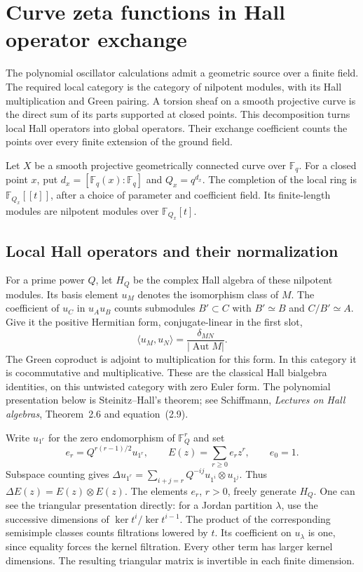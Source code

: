 \section{Curve zeta functions in Hall operator exchange}
\label{intake:curve:section}

The polynomial oscillator calculations admit a geometric source over a
finite field. The required local category is the category of nilpotent
modules, with its Hall multiplication and Green pairing.
A torsion sheaf on a smooth projective curve is the direct sum of its
parts supported at closed points. This decomposition turns local Hall
operators into global operators. Their exchange coefficient counts the
points over every finite extension of the ground field.

Let $X$ be a smooth projective geometrically connected curve over
$\mathbb F_q$. For a closed point $x$, put $d_x=[\mathbb F_q(x):\mathbb F_q]$
and $Q_x=q^{d_x}$. The completion of the local ring is
$\mathbb F_{Q_x}[[t]]$, after a choice of parameter and coefficient field.
Its finite-length modules are nilpotent modules over $\mathbb F_{Q_x}[t]$.

\subsection{Local Hall operators and their normalization}

For a prime power $Q$, let $H_Q$ be the complex Hall algebra of these
nilpotent modules. Its basis element $u_M$ denotes the isomorphism class
of $M$. The coefficient of $u_C$ in $u_Au_B$ counts submodules
$B'\subset C$ with $B'\simeq B$ and $C/B'\simeq A$.
Give it the positive Hermitian form, conjugate-linear in the first slot,
\[
 \langle u_M,u_N\rangle=\frac{\delta_{MN}}{|\operatorname{Aut}M|}.
\]
The Green coproduct is adjoint to multiplication for this form.
In this category it is cocommutative and multiplicative.
These are the classical Hall bialgebra identities, on this untwisted
category with zero Euler form. The polynomial presentation below is
Steinitz--Hall's theorem; see Schiffmann, \emph{Lectures on Hall algebras},
Theorem~2.6 and equation~(2.9).

Write $u_{1^r}$ for the zero endomorphism of $\mathbb F_Q^r$ and set
\[
 e_r=Q^{r(r-1)/2}u_{1^r},\qquad
 E(z)=\sum_{r\ge0}e_rz^r,\qquad e_0=1.
\]
Subspace counting gives
$\Delta u_{1^r}=\sum_{i+j=r}Q^{-ij}u_{1^i}\otimes u_{1^j}$.
Thus $\Delta E(z)=E(z)\otimes E(z)$. The elements $e_r$, $r>0$,
freely generate $H_Q$. One can see the triangular presentation directly:
for a Jordan partition $\lambda$, use the successive dimensions of
$\ker t^i/\ker t^{i-1}$. The product of the corresponding semisimple
classes counts filtrations lowered by $t$. Its coefficient on $u_\lambda$
is one, since equality forces the kernel filtration. Every other term
has larger kernel dimensions. The resulting triangular matrix is
invertible in each finite dimension.


